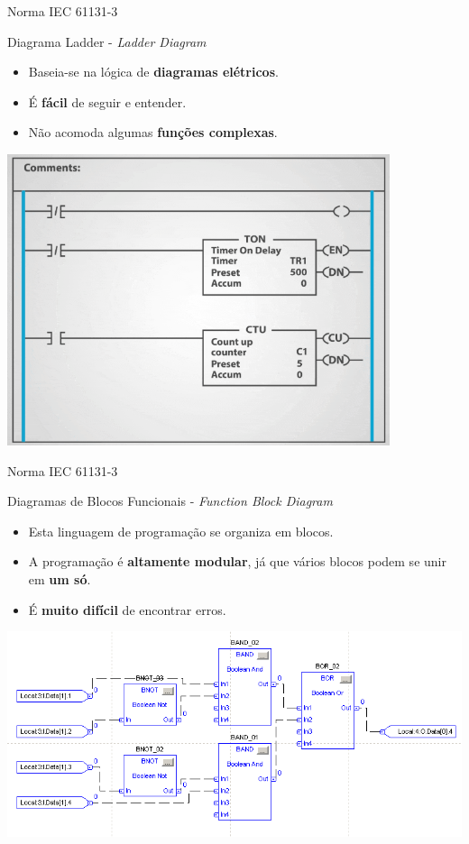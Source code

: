 \begin{frame}{Norma IEC 61131-3}
	\begin{block}{Diagrama Ladder - \textit{Ladder Diagram}}
		\begin{itemize}
			\item Baseia-se na lógica de \textbf{diagramas elétricos}.
			\item É \textbf{fácil} de seguir e entender.
			\item Não acomoda algumas \textbf{funções complexas}.
		\end{itemize}
	\end{block}

	\centering

	\includegraphics[height=0.6\textheight]{Figuras/Ch10/fig3}
	
\end{frame}


\begin{frame}{Norma IEC 61131-3}
	\begin{block}{Diagramas de Blocos Funcionais - \textit{Function Block Diagram}}
		\begin{itemize}
			\item Esta linguagem de programação se organiza em blocos.
			\item A programação é \textbf{altamente modular}, já que vários blocos podem se unir em \textbf{um só}.
			\item É \textbf{muito difícil} de encontrar erros.
		\end{itemize}
	\end{block}

	\centering
	
	\includegraphics[height=0.6\textheight]{Figuras/Ch10/fig4}
\end{frame}


